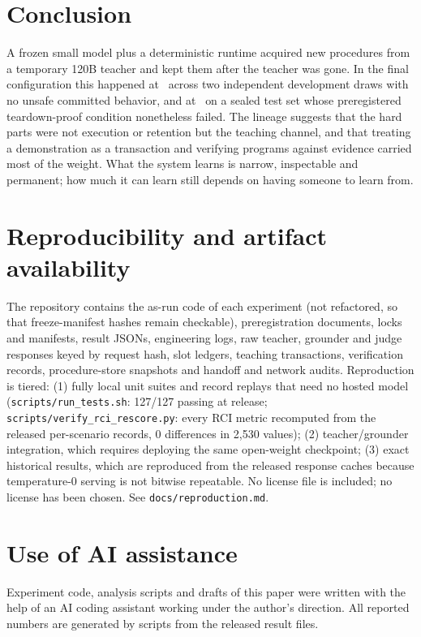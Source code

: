 \documentclass[10pt]{article}
\newcommand{\id}[1]{\nolinkurl{#1}}
\begin{document}
\section{Conclusion}\label{sec:conclusion}
A frozen small model plus a deterministic runtime acquired new procedures from a temporary 120B teacher and kept them after the teacher was gone. In the final configuration this happened at \rciDLearnedPooled\ across two independent development draws with no unsafe committed behavior, and at \lockedLearned\ on a sealed test set whose preregistered teardown-proof condition nonetheless failed. The lineage suggests that the hard parts were not execution or retention but the teaching channel, and that treating a demonstration as a transaction and verifying programs against evidence carried most of the weight. What the system learns is narrow, inspectable and permanent; how much it can learn still depends on having someone to learn from.

\section*{Reproducibility and artifact availability}\label{sec:repro}
The repository contains the as-run code of each experiment (not refactored, so that freeze-manifest hashes remain checkable), preregistration documents, locks and manifests, result JSONs, engineering logs, raw teacher, grounder and judge responses keyed by request hash, slot ledgers, teaching transactions, verification records, procedure-store snapshots and handoff and network audits. Reproduction is tiered: (1) fully local unit suites and record replays that need no hosted model (\id{scripts/run_tests.sh}: 127/127 passing at release; \id{scripts/verify_rci_rescore.py}: every RCI metric recomputed from the released per-scenario records, 0 differences in 2{,}530 values); (2) teacher/grounder integration, which requires deploying the same open-weight checkpoint; (3) exact historical results, which are reproduced from the released response caches because temperature-0 serving is not bitwise repeatable. No license file is included; no license has been chosen. See \id{docs/reproduction.md}.

\section*{Use of AI assistance}
Experiment code, analysis scripts and drafts of this paper were written with the help of an AI coding assistant working under the author's direction. All reported numbers are generated by scripts from the released result files.
\end{document}
